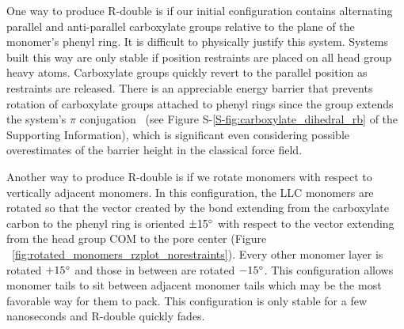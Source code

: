 \documentclass[journal=jpcbfk,manuscript=article]{achemso}
\begin{document}
  One way to produce R-double is if our initial configuration contains
  alternating parallel and anti-parallel carboxylate groups relative to the plane
  of the monomer's phenyl ring.  It is difficult to physically justify this
  system. Systems built this way are only stable if position restraints are
  placed on all head group heavy atoms.  Carboxylate groups quickly revert to the
  parallel position as restraints are released. There is an appreciable energy
  barrier that prevents rotation of carboxylate groups attached to phenyl rings
  since the group extends the system's $\pi$ conjugation~\cite{carey_organic_2011} (see Figure
  S-\ref{S-fig:carboxylate_dihedral_rb} of the Supporting Information), which is significant even considering
  possible overestimates of the barrier height in the classical force field. 
%  

  Another way to produce R-double is if we rotate monomers with respect to
  vertically adjacent monomers. In this configuration, the LLC monomers are rotated so
  that the vector created by the bond extending from the carboxylate carbon to
  the phenyl ring is oriented $\pm 15 \degree$ with respect to the vector
  extending from the head group COM to the pore center (Figure
  ~\ref{fig:rotated_monomers_rzplot_norestraints}). Every other monomer layer is
  rotated $+15 \degree$ and those in between are rotated $-15 \degree$. This
  configuration allows monomer tails to sit between adjacent monomer tails which
  may be the most favorable way for them to pack. This configuration is only
  stable for a few nanoseconds and R-double quickly fades. 
  
\end{document}

